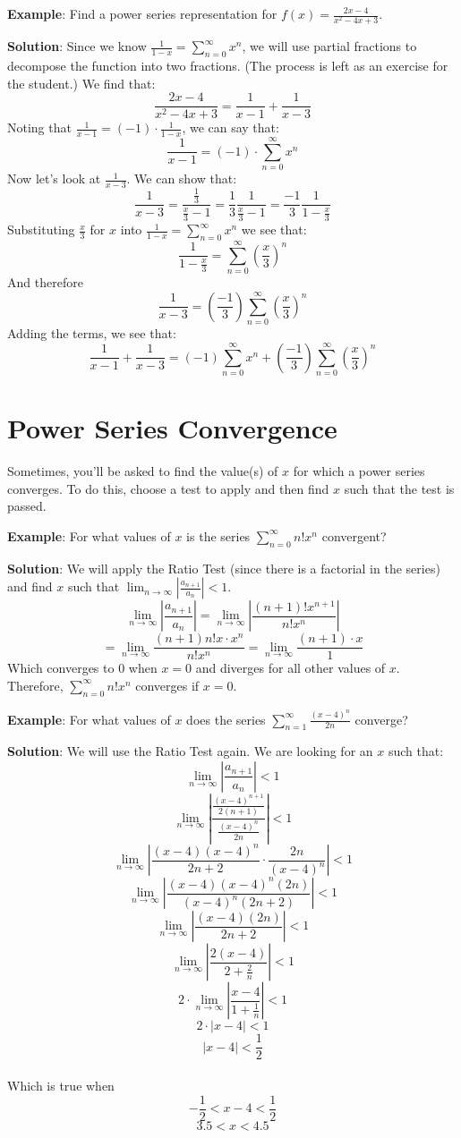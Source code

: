 \textbf{Example}: Find a power series representation for $f(x) = \frac{2x - 4}{
x^2 - 4x +3}$. 

\textbf{Solution}: Since we know $\frac{1}{1-x} = \sum_{n=0}^\infty x^n$, we 
will use partial fractions to decompose the function into two fractions. (The 
process is left as an exercise for the student.) We find that:
$$\frac{2x - 4}{x^2 - 4x + 3} = \frac{1}{x - 1} + \frac{1}{x-3}$$
Noting that $\frac{1}{x-1} = (-1) \cdot\frac{1}{1-x}$, we can say that:
$$\frac{1}{x-1} = (-1) \cdot \sum_{n=0}^\infty x^n$$
Now let's look at $\frac{1}{x-3}$. We can show that:
$$\frac{1}{x-3} = \frac{\frac{1}{3}}{\frac{x}{3}-1} = \frac{1}{3} \frac{1}{
\frac{x}{3}-1} = \frac{-1}{3} \frac{1}{1-\frac{x}{3}}$$
Substituting $\frac{x}{3}$ for $x$ into $\frac{1}{1-x} = \sum_{n=0}^\infty 
x^n$ we see that:
$$\frac{1}{1-\frac{x}{3}} = \sum_{n=0}^\infty \left(\frac{x}{3} \right)^n$$
And therefore
$$\frac{1}{x-3} = \left( \frac{-1}{3} \right) \sum_{n=0}^\infty \left( 
\frac{x}{3} \right)^n$$
Adding the terms, we see that:
$$\frac{1}{x-1} + \frac{1}{x-3} = (-1) \sum_{n=0}^\infty x^n + \left( 
\frac{-1}{3} \right) \sum_{n=0}^\infty \left( \frac{x}{3} \right)^n$$

\section{Power Series Convergence}
Sometimes, you'll be asked to find the value(s) of $x$ 
for which a power series converges. To do this, choose a test to apply and 
then find $x$ such that the test is passed. 

\textbf{Example}: For what values of $x$ is the series $\sum_{n=0}^\infty n!x^n$ 
convergent?

\textbf{Solution}: We will apply the Ratio Test (since there is a factorial in 
the series) and find $x$ such that $\lim_{n \to \infty} \left| \frac{a_{n+1}}{
a_n} \right| < 1$. 
$$\lim_{n \to \infty} \left| \frac{a_{n + 1}}{a_n} \right| = \lim_{n \to 
\infty} \left| \frac{(n+1)!x^{n+1}}{n!x^n} \right|$$
$$= \lim_{n \to \infty} \frac{(n+1) n! x \cdot x^n}{n!x^n} = \lim_{n \to 
\infty} \frac{(n+1) \cdot x}{1}$$
Which converges to $0$ when $x=0$ and diverges for all other values of $x$. 
Therefore, $\sum_{n=0}^\infty n!x^n$ converges if $x=0$. 

\textbf{Example}: For what values of $x$ does the series $\sum_{n=1}^\infty 
\frac{(x-4)^n}{2n}$ converge?

\textbf{Solution}: We will use the Ratio Test again. We are looking for an $x$ 
such that:
$$\lim_{n \to \infty} \left| \frac{a_{n+1}}{a_n} \right| < 1$$
$$\lim_{n \to \infty} \left| \frac{\frac{(x-4)^{n+1}}{2(n+1)}}{\frac{(x-4)^n}{
2n}} \right| < 1$$
$$\lim_{n \to \infty} \left| \frac{(x-4)(x-4)^n}{2n + 2} \cdot \frac{2n}{(x-4)^
n} \right| < 1$$
$$\lim_{n \to \infty} \left| \frac{(x-4)(x-4)^n(2n)}{(x-4)^n(2n+2)} \right| < 
1$$
$$\lim_{n \to \infty} \left| \frac{(x-4)(2n)}{2n + 2} \right| < 1$$
$$\lim_{n \to \infty} \left| \frac{2(x-4)}{2 + \frac{2}{n}} \right| < 1$$
$$2 \cdot \lim_{n \to \infty} \left| \frac{x-4}{1+ \frac{1}{n}} \right| < 1$$
$$2 \cdot \left| x-4 \right| < 1$$
$$\left| x-4 \right| < \frac{1}{2}$$\\
Which is true when 
$$-\frac{1}{2} < x-4 < \frac{1}{2}$$
$$3.5 < x < 4.5$$

